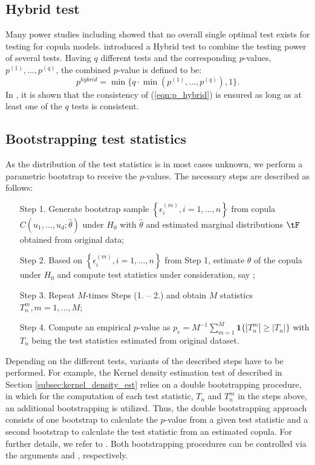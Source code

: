 \subsection{Hybrid test}\label{subsec:gofhybrid}
Many power studies including \citet{genest_remillard_beaudoin_2009} showed that no overall single optimal test exists for testing for copula models. \citet{zhang_okhrin_song_zhou_2016} introduced a Hybrid test to combine the testing power of several tests. Having $q$ different tests and the corresponding $p$-values, $p^{(1)}, \dots, p^{(q)}$, the combined $p$-value is defined to be:
\begin{equation} \label{eqn:p_hybrid}
p^{hybrid} = \min\{q \cdot \min{(p^{(1)}, \dots, p^{(q)})}, 1\}.
\end{equation}
\mycolor In \citet{zhang_okhrin_song_zhou_2016}, it is shown \bk that the consistency of (\ref{eqn:p_hybrid}) is ensured as long as at least one of the $q$ tests is consistent.

\subsection{Bootstrapping test statistics}
\label{sec:bootstrap_test_stat}
As the distribution of the test statistics is in most cases unknown, we perform a parametric bootstrap to receive the $p$-values. The necessary steps are described as follows: 
	\begin{itemize}
		\item [Step 1.] Generate bootstrap sample $\left\{\epsilon^{(m)}_i,i=1,\ldots,n\right\}$ from copula $C(u_1,\ldots, u_d;\hat\theta)$ under $H_0$ with $\hat \theta$ and estimated marginal distributions $\tF$ obtained from original data;
		\item [Step 2.] Based on $\left\{\epsilon^{(m)}_i,i=1,\ldots,n\right\}$ from Step 1, estimate $\theta$ of the copula under $H_0$ and compute test statistics under consideration, say ;
		\item [Step 3.] Repeat $M$-times Steps (1. -- 2.) and obtain $M$ statistics $T_n^{m},  m = 1,\ldots,M$;
		\item [Step 4.] Compute an empirical $p$-value as $p_e =  M^{-1}\sum_{m = 1}^{M} \mathbf{1}\{|T_n^{m}|\geq |T_n|\}$ with $T_n$ being the test statistics estimated from original dataset.
	\end{itemize}
Depending on the different tests, variants of the described steps have to be performed. \mycolor For example, the Kernel density estimation test of \citet{scaillet_2007} described in Section \ref{subsec:kernel_density_est} relies on a double bootstrapping procedure, in which for the computation of each test statistic, $T_n$ and $T_n^m$ in the steps above, an additional bootstrapping is utilized. Thus, the double bootstrapping approach consists of one bootstrap to calculate the $p$-value from a given test statistic and a second bootstrap to calculate the test statistic from an estimated copula. For further details, we refer to \cite{scaillet_2007}. Both bootstrapping procedures can be controlled via the arguments  and , respectively.\bk

